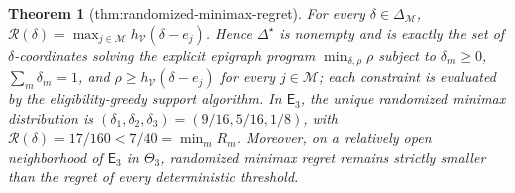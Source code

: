 \documentclass{article}
\newtheorem{theorem}{Theorem}
\begin{document}
\begin{theorem}[thm:randomized-minimax-regret]\label{thm:randomized-minimax-regret}
For every \(\delta\in\Delta_{\mathcal M}\), \(\mathcal R(\delta)=\max_{j\in\mathcal M}h_{\mathcal V}(\delta-e_j)\). Hence \(\Delta^\star\) is nonempty and is exactly the set of \(\delta\)-coordinates solving the explicit epigraph program \(\min_{\delta,\rho}\rho\) subject to \(\delta_m\ge0\), \(\sum_m\delta_m=1\), and \(\rho\ge h_{\mathcal V}(\delta-e_j)\) for every \(j\in\mathcal M\); each constraint is evaluated by the eligibility-greedy support algorithm. In \(\mathsf E_3\), the unique randomized minimax distribution is \((\delta_1,\delta_2,\delta_3)=(9/16,5/16,1/8)\), with \(\mathcal R(\delta)=17/160<7/40=\min_mR_m\). Moreover, on a relatively open neighborhood of \(\mathsf E_3\) in \(\Theta_3\), randomized minimax regret remains strictly smaller than the regret of every deterministic threshold.
\end{theorem}
\end{document}
